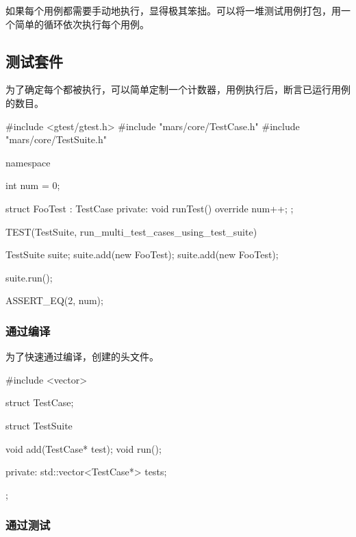 \begin{content}

如果每个用例都需要手动地执行，显得极其笨拙。可以将一堆测试用例打包，用一个简单的循环依次执行每个用例。

\subsection{测试套件}

为了确定每个都被执行，可以简单定制一个计数器，用例执行后，断言已运行用例的数目。

\begin{leftbar}
 \begin{c++}[caption={\ttfamily{test/mars/core/TestSuiteSpec.cc}}]
#include <gtest/gtest.h>
#include "mars/core/TestCase.h"
#include "mars/core/TestSuite.h"

namespace {
  int num = 0;

  struct FooTest : TestCase {
  private:
    void runTest() override {
      num++;
    }
  };
}

TEST(TestSuite, run_multi_test_cases_using_test_suite) {
  TestSuite suite;
  suite.add(new FooTest);
  suite.add(new FooTest);

  suite.run();

  ASSERT_EQ(2, num);
}
 \end{c++}
\end{leftbar}

\subsubsection{通过编译}

为了快速通过编译，创建的头文件。

\begin{leftbar}
 \begin{c++}[caption={\ttfamily{include/mars/core/TestSuite.h}}]
#include <vector>

struct TestCase;

struct TestSuite {
  void add(TestCase* test);
  void run();

private:
  std::vector<TestCase*> tests;
};
 \end{c++}
\end{leftbar}

\subsubsection{通过测试}


\end{content}
